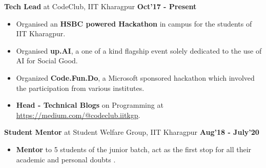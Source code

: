 \documentclass[10pt]{article}
\begin{document}
\vspace{-0.1ex}
{\color{headliner} \spacedhrule{0.15ex}{2.0ex}}
\vspace{-1ex}
\large { \textbf{Tech Lead} at CodeClub, IIT Kharagpur} \normalsize
\href{https://github.com/shmundhra/Credentials/tree/master/Positions\%20of\%20Responsibility} {\hspace{0.5ex}\faMousePointer}
{\hfill} \textbf{Oct'17 - Present}\\[-1.8em]
\begin{itemize}
    \item Organised an \textbf{HSBC powered Hackathon} in campus for the students of IIT Kharagpur.\\[-2em]
    \item Organised \textbf{up.AI}, a one of a kind flagship event solely dedicated to the use of AI for Social Good.\\[-2em]
    \item Organized \textbf{Code.Fun.Do}, a Microsoft sponsored hackathon which involved the participation from various institutes.\\[-2em]
    \item \textbf{Head - Technical Blogs} on Programming at 
    \href{https://medium.com/@codeclub.iitkgp}    {https://medium.com/@codeclub.iitkgp}.
\end{itemize}
\large { \textbf{Student Mentor} at Student Welfare Group, IIT Kharagpur} \normalsize
\href{https://github.com/shmundhra/Credentials/tree/master/Positions\%20of\%20Responsibility} {\hspace{0.5ex}\faMousePointer}
{\hfill} \textbf{Aug'18 - July'20}\\[-1.8em]
\begin{itemize}
    \item \textbf{Mentor} to 5 students of the junior batch, act as the first stop for all their academic and personal doubts %
    .
\end{itemize}
\end{document}
